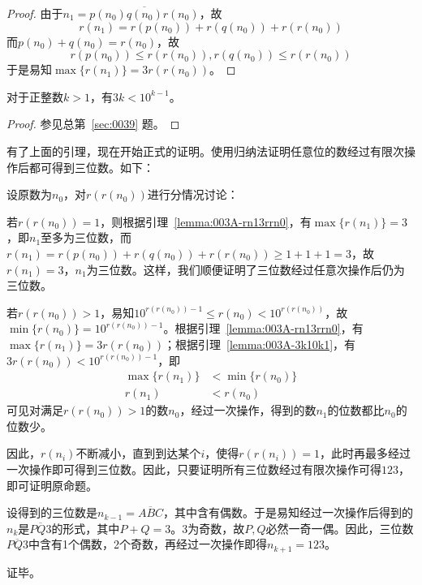 \begin{proof}
  由于$n_1 = \overline{p(n_0)q(n_0)r(n_0)}$，故
  \[ r(n_1) = r(p(n_0)) + r(q(n_0)) + r(r(n_0)) \]
  而$p(n_0) + q(n_0) = r(n_0)$，故
  \[ r(p(n_0)) \le r(r(n_0)), r(q(n_0)) \le r(r(n_0)) \]
  于是易知$\max\{r(n_1)\} = 3r(r(n_0))$。
\end{proof}

\begin{lemma} \label{lemma:003A-3k10k1}
  对于正整数$k > 1$，有$3k < 10^{k - 1}$。
\end{lemma}

\begin{proof}
  参见总第~\ref{sec:0039} 题。
\end{proof}

有了上面的引理，现在开始正式的证明。使用归纳法证明任意位的数经过有限次操作后都可得到三位数。如下：

设原数为$n_0$，对$r(r(n_0))$进行分情况讨论：

若$r(r(n_0)) = 1$，则根据引理~\ref{lemma:003A-rn13rrn0}，有$\max\{r(n_1)\} = 3$，即$n_1$至多为三位数，而$r(n_1) = r(p(n_0)) + r(q(n_0)) + r(r(n_0)) \ge 1 + 1 + 1 = 3$，故$r(n_1) = 3$，$n_1$为三位数。这样，我们顺便证明了三位数经过任意次操作后仍为三位数。

若$r(r(n_0)) > 1$，易知$10^{r(r(n_0)) - 1} \le r(n_0) < 10^{r(r(n_0))}$，故$\min\{r(n_0)\} = 10^{r(r(n_0)) - 1}$。根据引理~\ref{lemma:003A-rn13rrn0}，有$\max\{r(n_1)\} = 3r(r(n_0))$；根据引理~\ref{lemma:003A-3k10k1}，有$3r(r(n_0)) < 10^{r(r(n_0)) - 1}$，即
\begin{align*}
  \max\{r(n_1)\} &< \min\{r(n_0)\} \\
  r(n_1) &< r(n_0)
\end{align*}
可见对满足$r(r(n_0)) > 1$的数$n_0$，经过一次操作，得到的数$n_1$的位数都比$n_0$的位数少。

因此，$r(n_i)$不断减小，直到到达某个$i$，使得$r(r(n_i)) = 1$，此时再最多经过一次操作即可得到三位数。因此，只要证明所有三位数经过有限次操作可得$123$，即可证明原命题。

设得到的三位数是$n_{k - 1} = \overline{ABC}$，其中含有偶数。于是易知经过一次操作后得到的$n_k$是$\overline{PQ3}$的形式，其中$P + Q = 3$。3为奇数，故$P, Q$必然一奇一偶。因此，三位数$\overline{PQ3}$中含有1个偶数，2个奇数，再经过一次操作即得$n_{k + 1} = 123$。

证毕。
